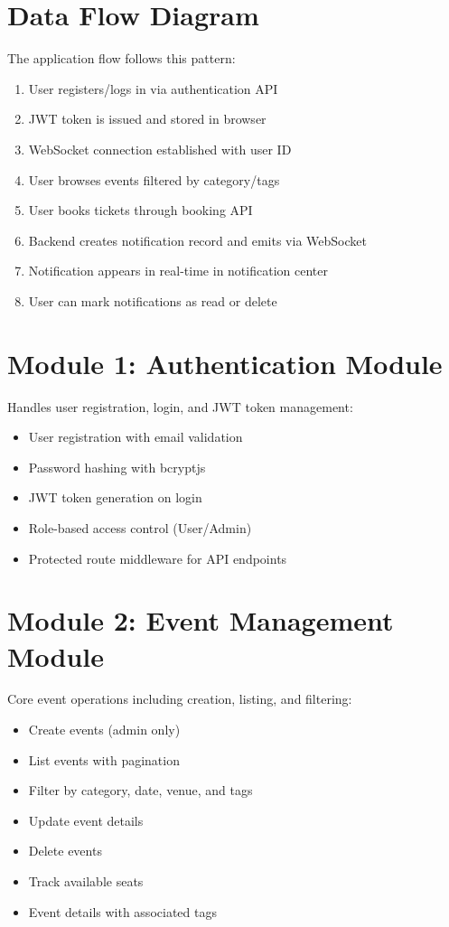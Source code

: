 \documentclass[12pt]{report}
\begin{document}
\section{Data Flow Diagram} 

The application flow follows this pattern:

\begin{enumerate}
\item User registers/logs in via authentication API
\item JWT token is issued and stored in browser
\item WebSocket connection established with user ID
\item User browses events filtered by category/tags
\item User books tickets through booking API
\item Backend creates notification record and emits via WebSocket
\item Notification appears in real-time in notification center
\item User can mark notifications as read or delete
\end{enumerate}

\section{Module 1: Authentication Module} 
Handles user registration, login, and JWT token management:
\begin{itemize}
\item User registration with email validation
\item Password hashing with bcryptjs
\item JWT token generation on login
\item Role-based access control (User/Admin)
\item Protected route middleware for API endpoints
\end{itemize}

\section{Module 2: Event Management Module} 
Core event operations including creation, listing, and filtering:
\begin{itemize}
\item Create events (admin only)
\item List events with pagination
\item Filter by category, date, venue, and tags
\item Update event details
\item Delete events
\item Track available seats
\item Event details with associated tags
\end{itemize}
\end{document}
